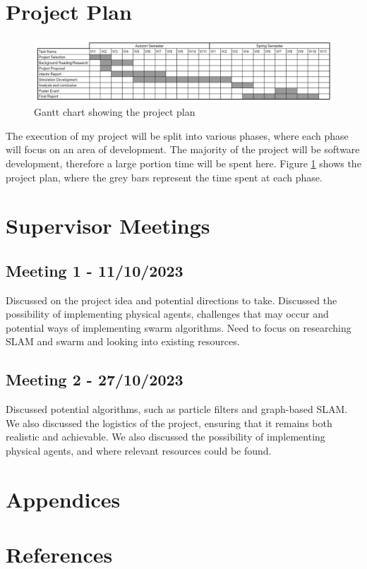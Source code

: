 \documentclass[12pt]{article}
\begin{document}
\section{Project Plan}
\begin{figure}[H]
    \centering
    \includegraphics[width=0.8\linewidth]{gantt_chart.png}
    \caption{Gantt chart showing the project plan}
    \label{fig:gantt_chart}
\end{figure}
The execution of my project will be split into various phases, where each phase will focus on an area of development. The
majority of the project will be software development, therefore a large portion time will be spent here. Figure
\ref{fig:gantt_chart} shows the project plan, where the grey bars represent the time spent at each phase.

\section{Supervisor Meetings}
\subsection{Meeting 1 - 11/10/2023}
Discussed on the project idea and potential directions to take. Discussed the possibility of implementing physical agents,
challenges that may occur and potential ways of implementing swarm algorithms. Need to focus on researching SLAM and swarm
and looking into existing resources.
\subsection{Meeting 2 - 27/10/2023}
Discussed potential algorithms, such as particle filters and graph-based SLAM. We also discussed the logistics of the project,
ensuring that it remains both realistic and achievable. We also discussed the possibility of implementing physical agents,
and where relevant resources could be found.

\section{Appendices}

\section{References}
\end{document}
